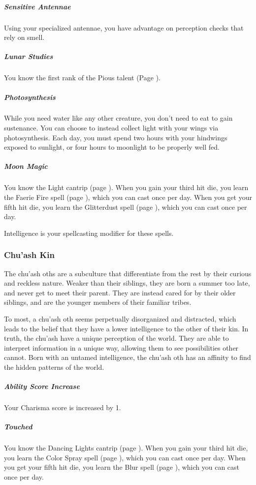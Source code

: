 \begin{linenumbers}
\subparagraph{Sensitive Antennae} Using your specialized antennae, you have advantage on perception checks that rely on smell.

\subparagraph{Lunar Studies} You know the first rank of the Pious talent (Page \pageref{tal::pious}).

\subparagraph{Photosynthesis} While you need water like any other creature, you don't need to eat to gain sustenance.
You can choose to instead collect light with your wings via photosynthesis.
Each day, you must spend two hours with your hindwings exposed to sunlight, or four hours to moonlight to be properly well fed.

\subparagraph{Moon Magic} You know the Light cantrip (page \pageref{spell::light}).
When you gain your third hit die, you learn the Faerie Fire spell (page \pageref{spell::faeriefire}), which you can cast once per day.
When you get your fifth hit die, you learn the Glitterdust spell (page \pageref{spell::glitterdust}), which you can cast once per day.

Intelligence is your spellcasting modifier for these spells.

\subsubsection{Chu'ash Kin}
The chu'ash oths are a subculture that differentiate from the rest by their curious and reckless nature.
Weaker than their siblings, they are born a summer too late, and never get to meet their parent.
They are instead cared for by their older siblings, and are the younger members of their familiar tribes.

To most, a chu'ash oth seems perpetually disorganized and distracted, which leads to the belief that they have a lower intelligence to the other of their kin.
In truth, the chu'ash have a unique perception of the world.
They are able to interpret information in a unique way, allowing them to see possibilities other cannot.
Born with an untamed intelligence, the chu'ash oth has an affinity to find the hidden patterns of the world.

\subparagraph{Ability Score Increase} Your Charisma score is increased by 1.

\subparagraph{Touched} You know the Dancing Lights cantrip (page \pageref{spell::dancinglights}).
When you gain your third hit die, you learn the Color Spray spell (page \pageref{spell::colorspray}), which you can cast once per day.
When you get your fifth hit die, you learn the Blur spell (page \pageref{spell::blur}), which you can cast once per day.


\end{linenumbers}
